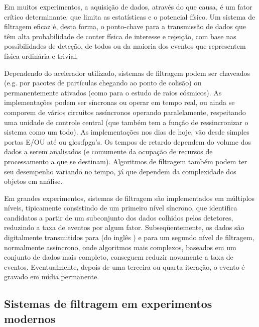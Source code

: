 Em muitos experimentos, a aquisição de dados, através do  que
causa, é um fator crítico determinante, que limita as estatísticas e o
potencial físico. Um sistema de filtragem eficaz é, desta forma, o ponto-chave
para a transmissão de dados que têm alta probabilidade de conter física de
interesse e rejeição, com base nas possibilidades de deteção, de todos ou da
maioria dos eventos que representem física ordinária e trivial.

Dependendo do acelerador utilizado, sistemas de filtragem podem ser chaveados
(e.g. por pacotes de partículas chegando ao ponto de colisão) ou
permanentemente ativados (como para o estudo de raios cósmicos). As
implementações podem ser síncronas ou operar em tempo real, ou ainda se
comporem de vários circuitos assíncronos operando paralelamente, respeitando
uma unidade de controle central (que também tem a função de ressincronizar o
sistema como um todo). As implementações nos dias de hoje, vão desde simples
portas E/OU até  ou \gls{glos:fpga}'s. Os
tempos de retardo dependem do volume dos dados a serem analisados (e comumente
da ocupação de recursos de processamento a que se destinam). Algoritmos de
filtragem também podem ter seu desempenho variando no tempo, já que dependem
da complexidade dos objetos em análise.

Em grandes experimentos, sistemas de filtragem são implementados em múltiplos
níveis, tipicamente consistindo de um primeiro nível síncrono, que identifica
candidatos a partir de um subconjunto dos dados colhidos pelos detetores,
reduzindo a taxa de eventos por algum fator. Subseqüentemente, os dados são
digitalmente transmitidos para  (do inglês
) e para um segundo nível de filtragem, normalmente assíncrono,
onde algoritmos mais complexos, baseados em um conjunto de dados mais
completo, conseguem reduzir novamente a taxa de eventos. Eventualmente,
depois de uma terceira ou quarta iteração, o evento é gravado em mídia
permanente.

\subsection{Sistemas de filtragem em experimentos modernos}

